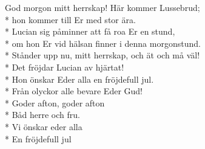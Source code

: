\begin{SongText}
    \begin{SongVerse}
        God morgon mitt herrskap! Här kommer Lussebrud;\\*%
        hon kommer till Er med stor ära.\\*%
        Lucian sig påminner att få roa Er en stund,\\*%
        om hon Er vid hälsan finner i denna morgonstund.\\*%
        Stånder upp nu, mitt herrskap, och ät och må väl!\\*%
        Det fröjdar Lucian av hjärtat!\\*%
        Hon önskar Eder alla en fröjdefull jul.\\*%
        Från olyckor alle bevare Eder Gud!\\*%
        Goder afton, goder afton\\*%
        Båd herre och fru.\\*%
        Vi önskar eder alla\\*%
        En fröjdefull jul
    \end{SongVerse}
\end{SongText}
